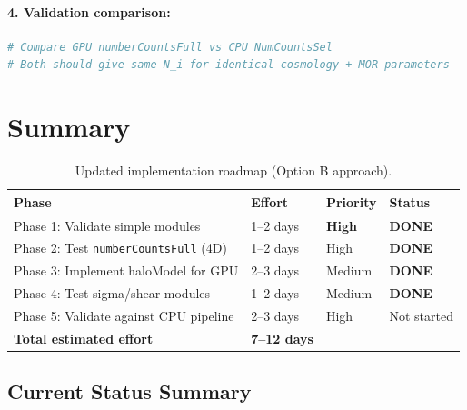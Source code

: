 \documentclass[a4paper, 11pt]{article}
\begin{document}
\paragraph{4. Validation comparison:}
\begin{lstlisting}[language=Python]
# Compare GPU numberCountsFull vs CPU NumCountsSel
# Both should give same N_i for identical cosmology + MOR parameters
\end{lstlisting}

\section{Summary}
\label{sec:summary}

\begin{table}[H]
\centering
\small
\begin{tabular}{@{}l l l l@{}}
\toprule
Phase & Effort & Priority & Status \\
\midrule
Phase 1: Validate simple modules & 1--2 days & \textbf{High} & \textcolor{green!50!black}{\textbf{DONE}} \\
Phase 2: Test \texttt{numberCountsFull} (4D) & 1--2 days & High & \textcolor{green!50!black}{\textbf{DONE}} \\
Phase 3: Implement haloModel for GPU & 2--3 days & Medium & \textcolor{green!50!black}{\textbf{DONE}} \\
Phase 4: Test sigma/shear modules & 1--2 days & Medium & \textcolor{green!50!black}{\textbf{DONE}} \\
Phase 5: Validate against CPU pipeline & 2--3 days & High & Not started \\
\midrule
\textbf{Total estimated effort} & \textbf{7--12 days} & & \\
\bottomrule
\end{tabular}
\caption{Updated implementation roadmap (Option B approach).}
\end{table}

\subsection{Current Status Summary}
\end{document}

